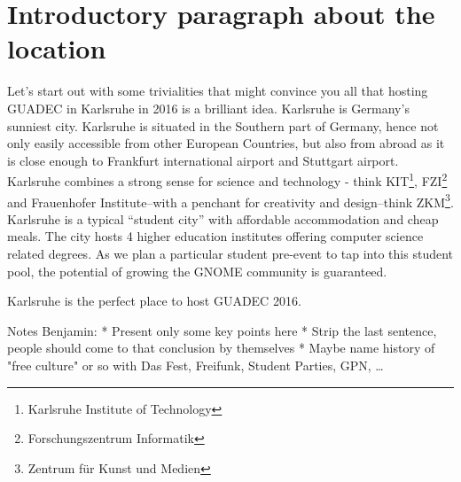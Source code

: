 \section{Introductory paragraph about the location}

Let's start out with some trivialities that might convince you all that hosting GUADEC in Karlsruhe in 2016 is a brilliant idea. Karlsruhe is Germany's sunniest city. Karlsruhe is situated in the Southern part of Germany, hence not only easily accessible from other European Countries, but also from abroad as it is close enough to Frankfurt international airport and Stuttgart airport. Karlsruhe combines a strong sense for science and technology - think KIT\footnote{Karlsruhe Institute of Technology}, FZI\footnote{Forschungszentrum Informatik} and Frauenhofer Institute–with a penchant for creativity and design–think ZKM\footnote{Zentrum für Kunst und Medien}. Karlsruhe is a typical “student city” with affordable accommodation and cheap meals. The city hosts 4 higher education institutes offering computer science related degrees. As we plan a particular student pre-event to tap into this student pool, the potential of growing the GNOME community is guaranteed.

Karlsruhe is the perfect place to host GUADEC 2016.




Notes Benjamin:
 * Present only some key points here
 * Strip the last sentence, people should come to that conclusion by themselves
 * Maybe name history of "free culture" or so with Das Fest, Freifunk, Student Parties, GPN, …



